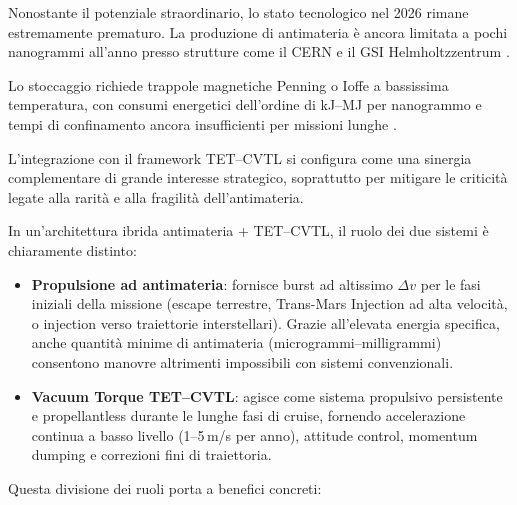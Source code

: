 \documentclass[11pt,a4paper]{article}
\let\oldcite\cite
\renewcommand{\cite}{\protect\oldcite}
\theoremstyle{plain}
\theoremstyle{definition}
\begin{document}
Nonostante il potenziale straordinario, lo stato tecnologico nel 2026 rimane estremamente prematuro. La produzione di antimateria è ancora limitata a pochi nanogrammi all’anno presso strutture come il CERN e il GSI Helmholtzzentrum \cite{ning_2022, cern_antimatter_2025}. 

\vspace{0.3cm}


Lo stoccaggio richiede trappole magnetiche Penning o Ioffe a bassissima temperatura, con consumi energetici dell’ordine di kJ–MJ per nanogrammo e tempi di confinamento ancora insufficienti per missioni lunghe \cite{holzscheiter_2019}.

\vspace{0.3cm}

L’integrazione con il framework TET--CVTL si configura come una sinergia complementare di grande interesse strategico, soprattutto per mitigare le criticità legate alla rarità e alla fragilità dell’antimateria.

\vspace{0.4cm}

In un’architettura ibrida antimateria + TET--CVTL, il ruolo dei due sistemi è chiaramente distinto:

\vspace{0.2cm}
\begin{itemize}
    \item \textbf{Propulsione ad antimateria}: fornisce burst ad altissimo $\Delta v$ per le fasi iniziali della missione (escape terrestre, Trans-Mars Injection ad alta velocità, o injection verso traiettorie interstellari). Grazie all’elevata energia specifica, anche quantità minime di antimateria (microgrammi–milligrammi) consentono manovre altrimenti impossibili con sistemi convenzionali.

    \vspace{0.2cm}
    \item \textbf{Vacuum Torque TET--CVTL}: agisce come sistema propulsivo persistente e propellantless durante le lunghe fasi di cruise, fornendo accelerazione continua a basso livello (1--5\,m/s per anno), attitude control, momentum dumping e correzioni fini di traiettoria.
\end{itemize}

\vspace{0.3cm}

Questa divisione dei ruoli porta a benefici concreti:
\end{document}
